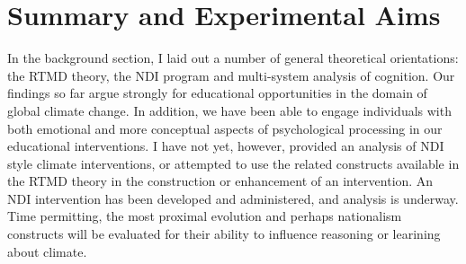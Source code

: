 \graphicspath{{experimental-description/}}

\chapter{Summary and Experimental Aims}

In the background section, I laid out a number of general theoretical
orientations: the RTMD theory, the NDI program and multi-system analysis of
cognition. Our findings so far argue strongly for educational opportunities in
the domain of global climate change. In addition, we have been able to engage
individuals with both emotional and more conceptual aspects of psychological
processing in our educational interventions. I have not yet, however, provided
an analysis of NDI style climate interventions, or attempted to use the related
constructs available in the RTMD theory in the construction or enhancement of an
intervention. An NDI intervention has been developed and administered, and
analysis is underway.  Time permitting, the most proximal evolution and perhaps
nationalism constructs will be evaluated for their ability to influence
reasoning or learining about climate.

